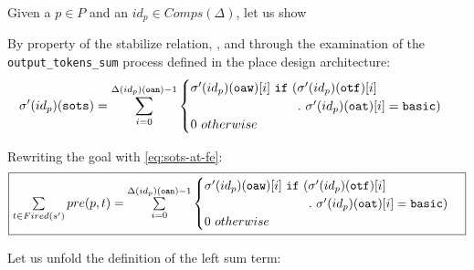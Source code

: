\documentclass[dvipsnames,12pt]{article}
\begin{document}
\begin{niproof}
  Given a $p\in{}P$ and an $id_p\in{}Comps(\Delta)$, let us show\\

  \exP{}
  
  By property of the stabilize relation, \InCsCompP{}, and through the
  examination of the \texttt{output_tokens_sum} process defined in the
  place design architecture:
  \begin{equation}
    \label{eq:sots-at-fe}
    \sigma'(id_p)(\texttt{sots})=\sum\limits_{i=0}^{\Delta(id_p)(\texttt{oan})-1}
    \begin{cases}
      \sigma'(id_p)(\texttt{oaw})[i]~\mathtt{if}~(\sigma'(id_p)(\texttt{otf})[i]~ \\
      \hspace{19.5ex}.~\sigma'(id_p)(\texttt{oat})[i]=\mathtt{basic}) \\
      0~otherwise \\
    \end{cases}
  \end{equation}

  Rewriting the goal with \eqref{eq:sots-at-fe}:\\
  \begin{equation*}
    \fbox{$
      \sum\limits_{t\in{}Fired(s')}pre(p,t)=\sum\limits_{i=0}^{\Delta(id_p)(\texttt{oan})-1}
      \begin{cases}
        \sigma'(id_p)(\texttt{oaw})[i]~\mathtt{if}~(\sigma'(id_p)(\texttt{otf})[i]~ \\
        \hspace{19.5ex}.~\sigma'(id_p)(\texttt{oat})[i]=\mathtt{basic}) \\
        0~otherwise \\
      \end{cases}$}
  \end{equation*}

  \noindent{}Let us unfold the definition of the left sum term:\\
  \\


\end{niproof}
\end{document}
